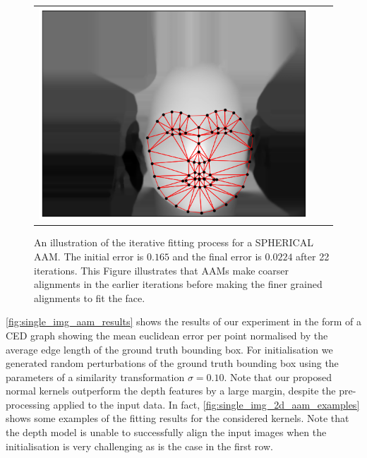 \begin{figure}
{\begin{tabular}{ccc}
    \includegraphics[valign=m,scale=0.16]{statistical_normals/images/lk2d/fitting/fitting_final_00224}
    \end{tabular}%
    }
    \caption{An illustration of the iterative fitting process for a SPHERICAL
             AAM. The initial error is $0.165$ and the final error is
             $0.0224$ after 22 iterations.
             This Figure illustrates that AAMs make coarser alignments
             in the earlier iterations before making the finer grained alignments
             to fit the face.}
\label{fig:aam-fitting-example}
\end{figure}
\setlength{\tabcolsep}{6pt}

\cref{fig:single_img_aam_results} shows the results of our
experiment in the form of a CED graph showing the mean euclidean error
per point normalised by the average edge length of the ground truth
bounding box. For initialisation we generated random perturbations of the
ground truth bounding box using the parameters of a similarity transformation
$\sigma = 0.10$. Note that our proposed normal kernels outperform the depth
features by a large margin, despite the pre-processing applied to the input
data. In fact, \cref{fig:single_img_2d_aam_examples} shows some examples
of the fitting results for the considered kernels. Note that the depth model
is unable to successfully align the input images when the initialisation is
very challenging as is the case in the first row.


